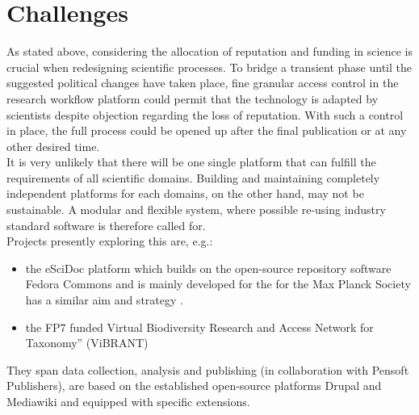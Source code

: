 \documentclass{article}
\begin{document}
\section{Challenges}

As stated above, considering the allocation of reputation and funding
in science is crucial when redesigning scientific processes. To bridge
a transient phase until the suggested political changes have taken
place, fine granular access control in the research workflow platform
could permit that the technology is adapted by scientists despite
objection regarding the loss of reputation. With such a control in
place, the full process could be opened up after the final publication
or at any other desired time.\\

It is very unlikely that there will be one single platform that can
fulfill the requirements of all scientific domains. Building and
maintaining completely independent platforms for each domains, on the
other hand, may not be sustainable. A modular and flexible system,
where possible re-using industry standard software is therefore called
for.\\

Projects presently exploring this are, e.g.:

\begin{itemize}
\item the eSciDoc platform which builds on the open-source repository
  software Fedora Commons \cite{Feudora} and is mainly developed for
  the for the Max Planck Society has a similar aim and strategy \cite{eSciDoc}.
\item the FP7 funded Virtual Biodiversity Research and Access Network
  for Taxonomy'' (ViBRANT) \cite{ViBRANT, Roberts, Blagoderov}
\end{itemize}

They span data collection, analysis and publishing (in collaboration
with Pensoft Publishers), are based on the established open-source
platforms Drupal \cite{Drupal} and Mediawiki \cite{Mediawiki} and
equipped with specific extensions.
\end{document}
